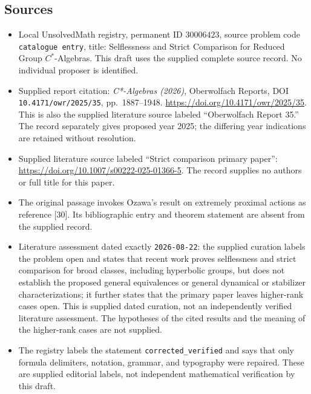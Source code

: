 \documentclass[11pt]{article}
\begin{document}
\subsection{Sources}
\begin{itemize}
\item Local UnsolvedMath registry, permanent ID \(30006423\), source problem code \texttt{catalogue entry}, title: Selflessness and Strict Comparison for Reduced Group \(C^*\)-Algebras. This draft uses the supplied complete source record. No individual proposer is identified.
\item Supplied report citation: \emph{C*-Algebras (2026)}, Oberwolfach Reports, DOI \texttt{10.4171/owr/2025/35}, pp.\ 1887--1948. \url{https://doi.org/10.4171/owr/2025/35}. This is also the supplied literature source labeled ``Oberwolfach Report 35.'' The record separately gives proposed year 2025; the differing year indications are retained without resolution.
\item Supplied literature source labeled ``Strict comparison primary paper'': \url{https://doi.org/10.1007/s00222-025-01366-5}. The record supplies no authors or full title for this paper.
\item The original passage invokes Ozawa's result on extremely proximal actions as reference [30]. Its bibliographic entry and theorem statement are absent from the supplied record.
\item Literature assessment dated exactly \texttt{2026-08-22}: the supplied curation labels the problem open and states that recent work proves selflessness and strict comparison for broad classes, including hyperbolic groups, but does not establish the proposed general equivalences or general dynamical or stabilizer characterizations; it further states that the primary paper leaves higher-rank cases open. This is supplied dated curation, not an independently verified literature assessment. The hypotheses of the cited results and the meaning of the higher-rank cases are not supplied.
\item The registry labels the statement \texttt{corrected\_verified} and says that only formula delimiters, notation, grammar, and typography were repaired. These are supplied editorial labels, not independent mathematical verification by this draft.
\end{itemize}
\end{document}
